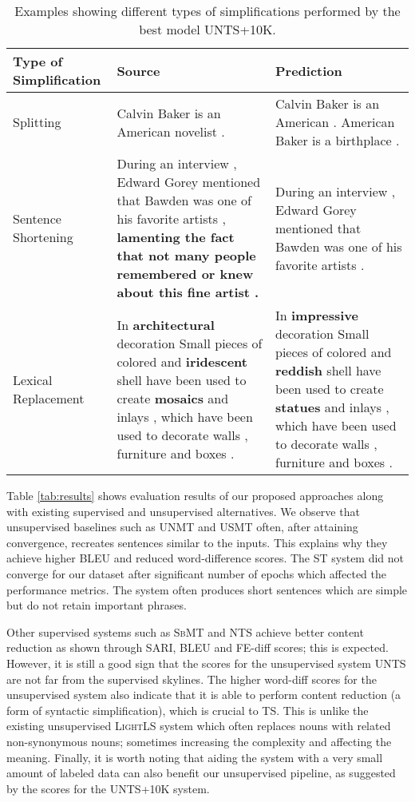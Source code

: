 \documentclass[11pt,a4paper]{article}
\begin{document}
\begin{table*}[t]
\scriptsize

\begin{tabular}{p{2.28cm}p{6.1cm}p{6.2cm}}
\toprule
\textbf{Type of Simplification} & \textbf{Source} & \textbf{Prediction} \\ 
\midrule
Splitting & Calvin Baker is an American novelist . & Calvin Baker is an American . American Baker is a birthplace .\\ \midrule
Sentence Shortening & During an interview , Edward Gorey mentioned that Bawden was one of his favorite artists , \textbf{lamenting the fact that not many people remembered or knew about this fine artist .} & During an interview , Edward Gorey mentioned that Bawden was one of his favorite artists . \\ \midrule
Lexical Replacement & In \textbf{architectural} decoration Small pieces of colored and \textbf{iridescent} shell have been used to create \textbf{mosaics} and inlays , which have been used to decorate walls , furniture and boxes . & In \textbf{impressive} decoration Small pieces of colored and \textbf{reddish} shell have been used to create \textbf{statues} and inlays , which have been used to decorate walls , furniture and boxes . \\ \bottomrule
\end{tabular}
\caption{Examples showing different types of simplifications performed by the best model \textsc{UNTS}+10K.}
\label{tab:typesimplf}
\end{table*} Table \ref{tab:results} shows evaluation results of our proposed approaches along with existing supervised and unsupervised alternatives. We observe that unsupervised baselines such as \textsc{UNMT} and \textsc{USMT} often, after attaining convergence, recreates sentences similar to the inputs. This explains why they achieve higher BLEU and reduced word-difference scores. The \textsc{ST} system did not converge for our dataset after significant number of epochs which affected the performance metrics. The system often produces short sentences which are simple but do not retain important phrases. 

Other supervised systems such as \textsc{SbMT} and \textsc{NTS} achieve better content reduction as shown through SARI, BLEU and FE-diff scores; this is expected. However, it is still a good sign that the scores for the unsupervised system \textsc{UNTS} are not far from the supervised skylines. The higher word-diff scores for the unsupervised system also indicate that it is able to perform content reduction (a form of syntactic simplification), which is crucial to TS. This is unlike the existing unsupervised \textsc{LightLS} system which often replaces nouns with related non-synonymous nouns; sometimes increasing the complexity and affecting the meaning. Finally, it is worth noting that aiding the system with a very small amount of labeled data can also benefit our unsupervised pipeline, as suggested by the scores for the  \textsc{UNTS}+10K system. 
\end{document}
